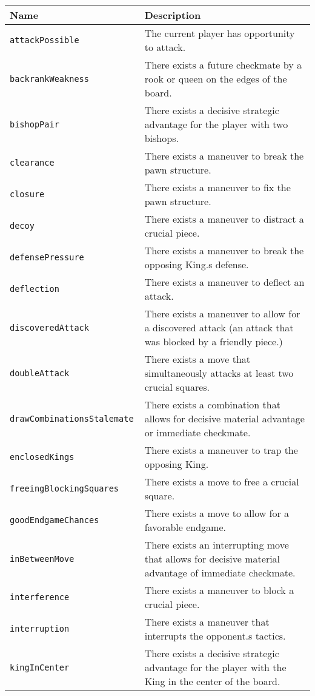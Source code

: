 \documentclass[11pt]{article}
\begin{document}
\begin{table*}[p]
\centering
\vspace{-0.7cm}
\begin{tabular}{lp{}}
\hline
\textbf{Name} & \textbf{Description} \\ \hline
\tt{attackPossible} & The current player has opportunity to attack. \\
\tt{backrankWeakness} & There exists a future checkmate by a rook or 
queen on the edges of the board. \\
\tt{bishopPair} & There exists a decisive strategic advantage for the 
player with two bishops. \\
\tt{clearance} & There exists a maneuver to break the pawn structure. \\ 
\tt{closure} & There exists a maneuver to fix the pawn structure. \\
\tt{decoy} & There exists a maneuver to distract a crucial piece. \\
\tt{defensePressure} & There exists a maneuver to break the opposing 
King.s defense. \\
\tt{deflection} & There exists a maneuver to deflect an attack.  \\ 
\tt{discoveredAttack} & There exists a maneuver to allow for a 
discovered attack (an attack that was blocked by a friendly piece.) \\
\tt{doubleAttack} & There exists a move that simultaneously attacks at 
least two crucial squares. \\
\tt{drawCombinationsStalemate} & There exists a combination that allows 
for decisive material advantage or immediate checkmate. \\
\tt{enclosedKings} & There exists a maneuver to trap the opposing King. 
\\
\tt{freeingBlockingSquares} & There exists a move to free a crucial 
square. \\
\tt{goodEndgameChances} & There exists a move to allow for a favorable 
endgame. \\
\tt{inBetweenMove} & There exists an interrupting move that allows for 
decisive material advantage of immediate checkmate. \\ 
\tt{interference} & There exists a maneuver to block a crucial piece. \\ 
\tt{interruption} & There exists a maneuver that interrupts the 
opponent.s tactics. \\
\tt{kingInCenter} & There exists a decisive strategic advantage for the 
player with the King in the center of the board. \\

\end{tabular}
\end{table*}
\end{document}
